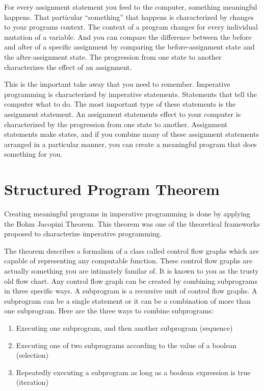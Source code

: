 For every assignment statement you feed to the computer, something
meaningful happens. That particular ``something'' that happens is
characterized by changes to your programs context. The context of a
program changes for every individual mutation of a variable. And you can
compare the difference between the before and after of a specific
assignment by comparing the before-assignment state and the
after-assignment state. The progression from one state to another
characterizes the effect of an assignment.

This is the important take away that you need to remember. Imperative
programming is characterized by imperative statements. Statements that
tell the computer what to do. The most important type of these
statements is the assignment statement. An assignment statements effect
to your computer is characterized by the progression from one state to
another. Assignment statements make states, and if you combine many of
these assignment statements arranged in a particular manner, you can
create a meaningful program that does something for you.

\section{Structured Program
Theorem}\label{imperative-programming.md__structured-program-theorem}

Creating meaningful programs in imperative programming is done by
applying the Bohm Jacopini Theorem. This theorem was one of the
theoretical frameworks proposed to characterize imperative programming.

The theorem describes a formalism of a class called control flow graphs
which are capable of representing any computable function. These control
flow graphs are actually something you are intimately familar of. It is
known to you as the trusty old flow chart. Any control flow graph can be
created by combining subprograms in three specific ways. A subprogram is
a recursive unit of control flow graphs. A subprogram can be a single
statement or it can be a combination of more than one subprogram. Here
are the three ways to combine subprograms:

\begin{enumerate}
\def\labelenumi{\arabic{enumi}.}
\tightlist
\item
  Executing one subprogram, and then another subprogram (sequence)
\item
  Executing one of two subprograms according to the value of a boolean
  (selection)
\item
  Repeatedly executing a subprogram as long as a boolean expression is
  true (iteration)
\end{enumerate}

